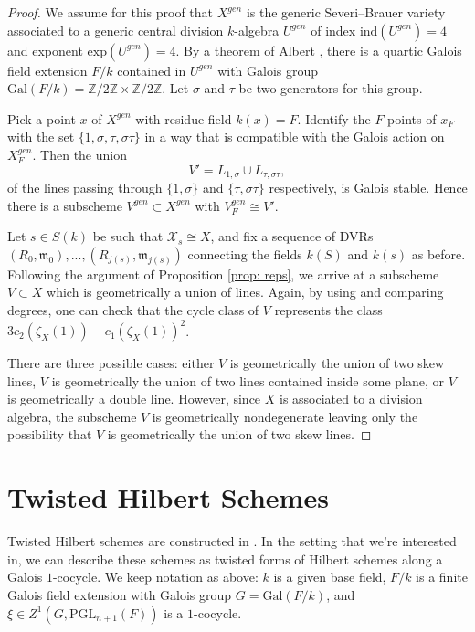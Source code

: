 \documentclass[12pt]{amsart}
\theoremstyle{definition}
\begin{document}
\begin{proof}
We assume for this proof that $X^{gen}$ is the generic Severi--Brauer variety associated to a generic central division $k$-algebra $U^{gen}$ of index $\mathrm{ind}(U^{gen})=4$ and exponent $\mathrm{exp}(U^{gen})=4$. By a theorem of Albert \cite[\S XI.6 Theorem 9]{MR0000595}, there is a quartic Galois field extension $F/k$ contained in $U^{gen}$ with Galois group $\mathrm{Gal}(F/k)=\mathbb{Z}/2\mathbb{Z}\times \mathbb{Z}/2\mathbb{Z}$. Let $\sigma$ and $\tau$ be two generators for this group.

Pick a point $x$ of $X^{gen}$ with residue field $k(x)=F$. Identify the $F$-points of $x_F$ with the set $\{1,\sigma,\tau,\sigma\tau\}$ in a way that is compatible with the Galois action on $X^{gen}_F$. Then the union \[ V'=L_{1,\sigma}\cup L_{\tau,\sigma\tau},\] of the lines passing through $\{1,\sigma\}$ and $\{\tau,\sigma\tau\}$ respectively, is Galois stable. Hence there is a subscheme $V^{gen}\subset X^{gen}$ with $V^{gen}_F\cong V'$.

Let $s\in S(k)$ be such that $\mathcal{X}_s\cong X$, and fix a sequence of DVRs $(R_0,\mathfrak{m}_0),..., (R_{j(s)},\mathfrak{m}_{j(s)})$ connecting the fields $k(S)$ and $k(s)$ as before. Following the argument of Proposition \ref{prop: reps}, we arrive at a subscheme $V\subset X$ which is geometrically a union of lines. Again, by using \cite[Proposition 3.2]{MR3590349} and comparing degrees, one can check that the cycle class of $V$ represents the class $3c_2(\zeta_X(1))-c_1(\zeta_X(1))^2$. 

There are three possible cases: either $V$ is geometrically the union of two skew lines, $V$ is geometrically the union of two lines contained inside some plane, or $V$ is geometrically a double line. However, since $X$ is associated to a division algebra, the subscheme $V$ is geometrically nondegenerate \cite[Lemma 3.4]{em} leaving only the possibility that $V$ is geometrically the union of two skew lines.
\end{proof}

\section{Twisted Hilbert Schemes}\label{sec: twhilb}
Twisted Hilbert schemes are constructed in \cite{em}. In the setting that we're interested in, we can describe these schemes as twisted forms of Hilbert schemes along a Galois $1$-cocycle. We keep notation as above: $k$ is a given base field, $F/k$ is a finite Galois field extension with Galois group $G=\mathrm{Gal}(F/k)$, and $\xi\in Z^1(G,\mathrm{PGL}_{n+1}(F))$ is a $1$-cocycle.
\end{document}

